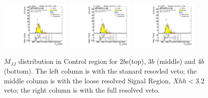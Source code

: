 \begin{figure}[htbp!]
\begin{center}
\includegraphics[angle=270, width=0.3\textwidth]{./figures/boosted/AppendixResveto/Moriond_FourTag_Control_mHH_l.pdf}
\includegraphics[angle=270, width=0.3\textwidth]{./figures/boosted/AppendixResveto/Moriond_resveto_FourTag_Control_mHH_l.pdf}
\includegraphics[angle=270, width=0.3\textwidth]{./figures/boosted/AppendixResveto/Moriond_fullresveto_FourTag_Control_mHH_l.pdf}\\
  \caption{ $M_{JJ}$ distribution in Control region for 2$b$s(top), 3$b$ (middle) and 4$b$ (bottom). The left column is with the stanard resovled veto; the middle column is with the loose resolved Signal Region, $Xhh < 3.2$ veto; the right column is with the full resolved veto.}
\label{fig:app-resveto-cr}
\end{center}
\end{figure}



